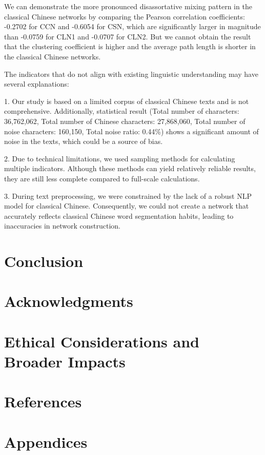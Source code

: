 \documentclass[11pt]{article}
\begin{document}
We can demonstrate the more pronounced disassortative mixing pattern in the classical Chinese networks by comparing the Pearson correlation coefficients: -0.2702 for CCN and -0.6054 for CSN, which are significantly larger in magnitude than -0.0759 for CLN1 and -0.0707 for CLN2.  But we cannot obtain the result that the clustering coefficient is higher and the average path length is shorter in the classical Chinese networks. 

The indicators that do not align with existing linguistic understanding may have several explanations:

1. Our study is based on a limited corpus of classical Chinese texts and is not comprehensive. Additionally, statistical result (Total number of characters: 36,762,062, Total number of Chinese characters: 27,868,060, Total number of noise characters: 160,150, Total noise ratio: 0.44\%) shows a significant amount of noise in the texts, which could be a source of bias.

2. Due to technical limitations, we used sampling methods for calculating multiple indicators. Although these methods can yield relatively reliable results, they are still less complete compared to full-scale calculations.

3. During text preprocessing, we were constrained by the lack of a robust NLP model for classical Chinese. Consequently, we could not create a network that accurately reflects classical Chinese word segmentation habits, leading to inaccuracies in network construction.
\section{Conclusion}

\section*{Acknowledgments}

\section*{Ethical Considerations and Broader Impacts}

\section*{References}

\appendix
\section*{Appendices}
\end{document}
